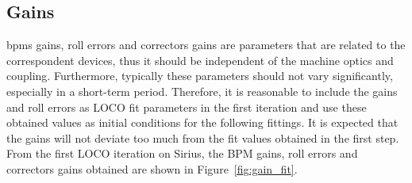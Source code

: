 \subsection{Gains}
\glspl{bpm} gains, roll errors and correctors gains are parameters that are related to the correspondent devices, thus it should be independent of the machine optics and coupling. Furthermore, typically these parameters should not vary significantly, especially in a short-term period. Therefore, it is reasonable to include the gains and roll errors as LOCO fit parameters in the first iteration and use these obtained values as initial conditions for the following fittings. It is expected that the gains will not deviate too much from the fit values obtained in the first step. From the first LOCO iteration on Sirius, the BPM gains, roll errors and correctors gains obtained are shown in Figure~\ref{fig:gain_fit}.
